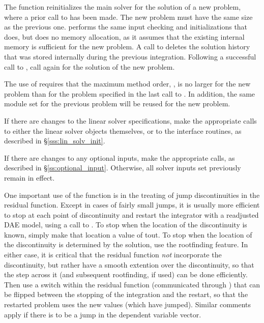 {The function  reinitializes the main {\ida} solver for
the solution of a new problem, where a prior call to  has
been made. The new problem must have the same size as the previous one.
 performs the same input checking and initializations
that  does, but does no memory allocation, as it assumes that
the existing internal memory is sufficient for the new problem.
A call to  deletes the solution history that was stored
internally during the previous integration.  Following a successful call to
, call  again for the solution of the new problem.

The use of  requires that the maximum method order,
, is no larger for the new problem than for the problem
specified in the last call to .  In addition, the same
{\nvector} module set for the previous problem
will be reused for the new problem.

If there are changes to the linear solver specifications, make the
appropriate calls to either the linear solver objects themselves, or
to the {\idals} interface routines, as described in
\S\ref{sss:lin_solv_init}.

If there are changes to any optional inputs, make the appropriate
 calls, as described in \S\ref{ss:optional_input}.
Otherwise, all solver inputs set previously remain in effect.

One important use of the  function is in the treating
of jump discontinuities in the residual function.  Except in cases of
fairly small jumps, it is usually more efficient to stop at each point
of discontinuity and restart the integrator with a readjusted DAE
model, using a call to .  To stop when the location of
the discontinuity is known, simply make that location a value of tout.
To stop when the location of the discontinuity is determined by the
solution, use the rootfinding feature.  In either case, it is critical
that the residual function {\it not} incorporate the discontinuity, but
rather have a smooth extention over the discontinuity, so that the
step across it (and subsequent rootfinding, if used) can be done
efficiently.  Then use a switch within the residual function (communicated
through ) that can be flipped between the stopping of
the integration and the restart, so that the restarted problem uses
the new values (which have jumped).  Similar comments apply if there
is to be a jump in the dependent variable vector.

}
